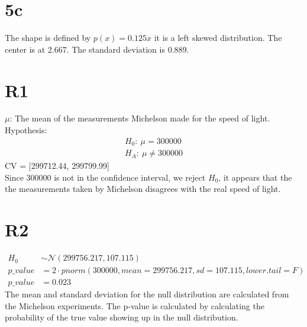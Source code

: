\documentclass{article}
\begin{document}
\section*{5c}
The shape is defined by $p(x) = 0.125x$ it is a left skewed distribution. The
center is at 2.667. The standard deviation is 0.889.

\section*{R1}
$\mu$: The mean of the measurements Michelson made for the speed of light.\\
Hypothesis:
\begin{align*}
	H_0:\ \mu = 300000\\
	H_A:\ \mu \neq 300000
\end{align*}
CV = [299712.44, 299799.99]\\
Since 300000 is not in the confidence interval, we reject $H_0$, it appears that
the the measurements taken by Michelson disagrees with the real speed of light.

\section*{R2}
\begin{align*}
H_0 &\sim \mathcal{N}(299756.217, 107.115)\\
p\_value &= 2 \cdot pnorm(300000, mean=299756.217, sd=107.115, lower.tail=F)\\
p\_value &= 0.023
\end{align*}
The mean and standard deviation for the null distribution are calculated from
the Michelson experiments. The p-value is calculated by calculating the
probability of the true value showing up in the null distribution.
\end{document}
